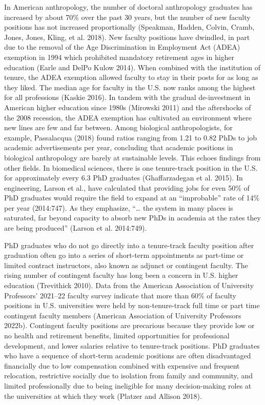 \documentclass[
  12pt,
]{article}
\begin{document}
In American anthropology, the number of doctoral anthropology graduates
has increased by about 70\% over the past 30 years, but the number of
new faculty positions has not increased proportionally (Speakman,
Hadden, Colvin, Cramb, Jones, Jones, Kling, et al. 2018). New faculty
positions have dwindled, in part due to the removal of the Age
Discrimination in Employment Act (ADEA) exemption in 1994 which
prohibited mandatory retirement ages in higher education (Earle and
DelPo Kulow 2014). When combined with the institution of tenure, the
ADEA exemption allowed faculty to stay in their posts for as long as
they liked. The median age for faculty in the U.S. now ranks among the
highest for all professions (Kaskie 2016). In tandem with the gradual
de-investment in American higher education since 1980s (Mirowski 2011)
and the aftershocks of the 2008 recession, the ADEA exemption has
cultivated an environment where new lines are few and far between. Among
biological anthropologists, for example, Passalacqua (2018) found ratios
ranging from 1.21 to 0.82 PhDs to job academic advertisements per year,
concluding that academic positions in biological anthropology are barely
at sustainable levels. This echoes findings from other fields. In
biomedical sciences, there is one tenure-track position in the U.S. for
approximately every 6.3 PhD graduates (Ghaffarzadegan et al. 2015). In
engineering, Larson et al., have calculated that providing jobs for even
50\% of PhD graduates would require the field to expand at an
``improbable'' rate of 14\% per year (2014:747). As they emphasize,
``\ldots{} the system in many places is saturated, far beyond capacity
to absorb new PhDs in academia at the rates they are being produced''
(Larson et al. 2014:749).

PhD graduates who do not go directly into a tenure-track faculty
position after graduation often go into a series of short-term
appointments as part-time or limited contract instructors, also known as
adjunct or contingent faculty. The rising number of contingent faculty
has long been a concern in U.S. higher education (Trevithick 2010). Data
from the American Association of University Professors' 2021--22 faculty
survey indicate that more than 60\% of faculty positions in U.S.
universities were held by non-tenure-track full time or part time
contingent faculty members (American Association of University
Professors 2022b). Contingent faculty positions are precarious because
they provide low or no health and retirement benefits, limited
opportunities for professional development, and lower salaries relative
to tenure-track positions. PhD graduates who have a sequence of
short-term academic positions are often disadvantaged financially due to
low compensation combined with expensive and frequent relocation,
restrictive socially due to isolation from family and community, and
limited professionally due to being ineligible for many decision-making
roles at the universities at which they work (Platzer and Allison 2018).
\end{document}
